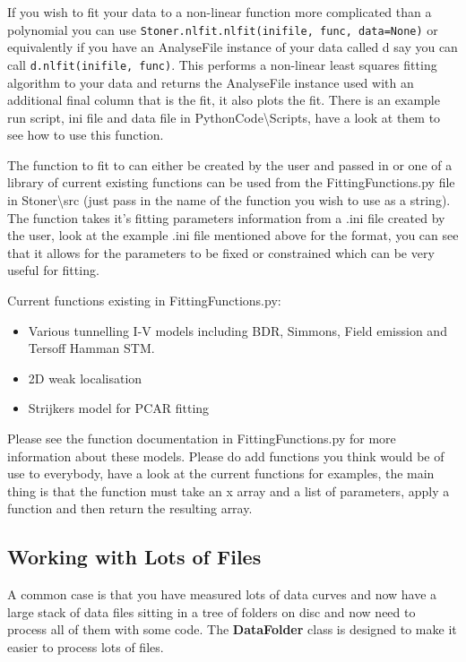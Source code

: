 \documentclass[a4paper,11pt]{scrartcl}
\begin{document}
If you wish to fit your data to a non-linear function more complicated than a polynomial you can use \verb#Stoner.nlfit.nlfit(inifile, func, data=None)# or equivalently if you have an AnalyseFile instance of your data called d say you can call \verb#d.nlfit(inifile, func)#. This performs a non-linear least squares fitting algorithm to your data and returns the AnalyseFile instance used with an additional final column that is the fit, it also plots the fit. There is an example run script, ini file and data file in PythonCode\textbackslash Scripts, have a look at them to see how to use this function.

The function to fit to can either be created by the user and passed in or one of a library of current existing functions can be used from the FittingFunctions.py file in Stoner\textbackslash src (just pass in the name of the function you wish to use as a string). The function takes it's fitting parameters information from a .ini file created by the user, look at the example .ini file mentioned above for the format, you can see that it allows for the parameters to be fixed or constrained which can be very useful for fitting. 

Current functions existing in FittingFunctions.py:
\begin{itemize}
\item Various tunnelling I-V models including BDR, Simmons, Field emission and Tersoff Hamman STM.  
\item 2D weak localisation
\item Strijkers model for PCAR fitting
\end{itemize}
Please see the function documentation in FittingFunctions.py for more information about these models. Please do add functions you think would be of use to everybody, have a look at the current functions for examples, the main thing is that the function must take an x array and a list of parameters, apply a function and then return the resulting array.  
 
\subsection{Working with Lots of Files}

A common case is that you have measured lots of data curves and now have a large stack of data files sitting in a tree of folders on disc and now need to process all of them with some code. The \textbf{DataFolder} class is designed to make it easier to process lots of files.
\end{document}

